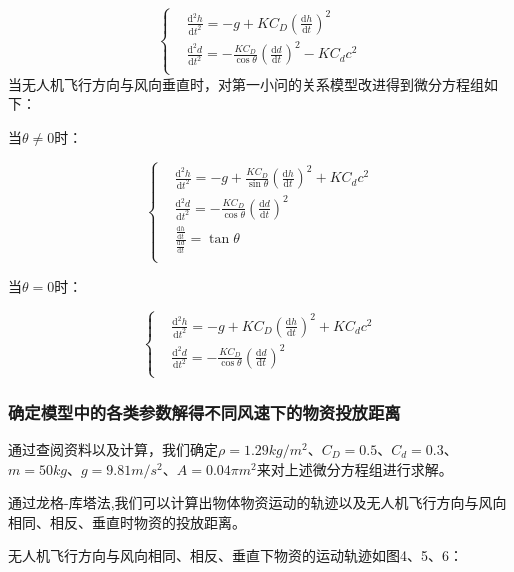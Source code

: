\documentclass[normalsize]{ctexart}
\begin{document}
\begin{equation}
	\begin{cases}
		& \frac{\mathrm{d}^2h}{\mathrm{d}t^2}=-g+KC_D(\frac{\mathrm{d}h}{\mathrm{d}t})^2\\
		& \frac{\mathrm{d}^2d}{\mathrm{d}t^2}=-\frac{KC_D}{\cos\theta}(\frac{\mathrm{d}d}{\mathrm{d}t})^2-{KC_d}c^2\\
	\end{cases}
\end{equation}
当无人机飞行方向与风向垂直时，对第一小问的关系模型改进得到微分方程组如下：
\begin{center}
	当$\theta\neq0$时：
\end{center}
\begin{equation}
	\begin{cases}
		& \frac{\mathrm{d}^2h}{\mathrm{d}t^2}=-g+\frac{KC_D}{\sin\theta}(\frac{\mathrm{d}h}{\mathrm{d}t})^2+KC_dc^2\\
		& \frac{\mathrm{d}^2d}{\mathrm{d}t^2}=-\frac{KC_D}{\cos\theta}(\frac{\mathrm{d}d}{\mathrm{d}t})^2\\
		& \frac{\frac{\mathrm{d}h}{\mathrm{d}t}}{\frac{\mathrm{d}d}{\mathrm{d}t}}=\tan\theta\\
	\end{cases}
\end{equation}
\begin{center}
	当$\theta=0$时：
\end{center}
\begin{equation}
	\begin{cases}
		& \frac{\mathrm{d}^2h}{\mathrm{d}t^2}=-g+KC_D(\frac{\mathrm{d}h}{\mathrm{d}t})^2+KC_dc^2\\
		& \frac{\mathrm{d}^2d}{\mathrm{d}t^2}=-\frac{KC_D}{\cos\theta}(\frac{\mathrm{d}d}{\mathrm{d}t})^2\\
	\end{cases}
\end{equation}
\subsubsection{确定模型中的各类参数解得不同风速下的物资投放距离}
通过查阅资料以及计算，我们确定$\rho=1.29kg/m^2$、$C_D=0.5$、$C_d=0.3$、$m=50kg$、$g=9.81 m/s^2$、$A=0.04\pi  m^2$来对上述微分方程组进行求解。
\par 通过龙格-库塔法,我们可以计算出物体物资运动的轨迹以及无人机飞行方向与风向相同、相反、垂直时物资的投放距离。
\par 无人机飞行方向与风向相同、相反、垂直下物资的运动轨迹如图4、5、6：
\end{document}
